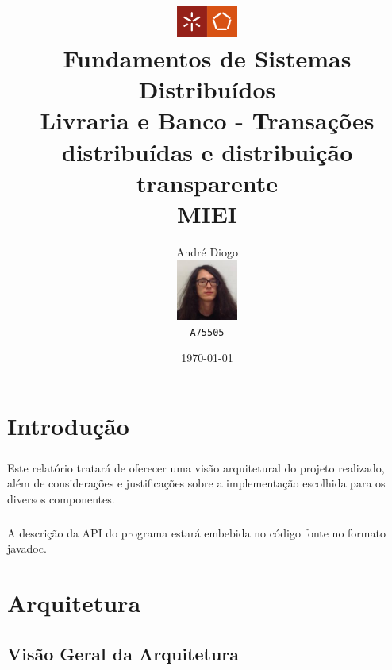 \documentclass[11pt,a4paper]{report}
\title{\includegraphics[width=2cm]{logo-ee.png}\\
Fundamentos de Sistemas Distribuídos\\Livraria e Banco - Transações distribuídas e distribuição transparente\\MIEI}
\author{
  André Diogo\\
  \includegraphics[width=2cm]{c.jpeg}\\
  \texttt{A75505}
}
\date{\today}
\begin{document}
\maketitle

\newpage

\tableofcontents

\chapter{Introdução}

\paragraph{}Este relatório tratará de oferecer uma visão arquitetural do projeto realizado, além de considerações e justificações sobre a implementação escolhida para os diversos componentes.

\paragraph{}A descrição da API do programa estará embebida no código fonte no formato javadoc.

\chapter{Arquitetura}

\section{Visão Geral da Arquitetura}

%
\newpage
\end{document}

